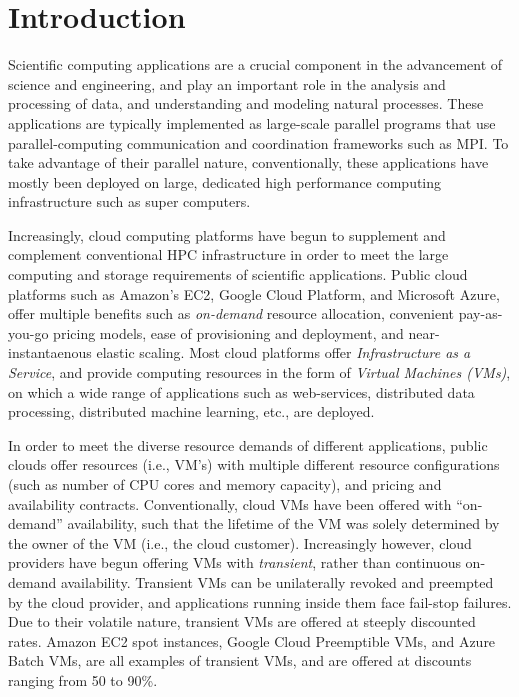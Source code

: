 \section{Introduction}


Scientific computing applications are a crucial component in the advancement of science and engineering, and play an important role in the analysis and processing of data, and understanding and modeling natural processes. 
These applications are typically implemented as large-scale parallel programs that use parallel-computing communication and coordination frameworks such as MPI.
To take advantage of their parallel nature, conventionally, these applications have mostly been deployed on large, dedicated high performance computing infrastructure such as super computers. 



Increasingly, cloud computing platforms have begun to supplement and complement conventional HPC infrastructure in order to meet the large computing and storage requirements of scientific applications. 
Public cloud platforms such as Amazon's EC2, Google Cloud Platform, and Microsoft Azure, offer multiple benefits such as \emph{on-demand} resource allocation, convenient pay-as-you-go pricing models, ease of provisioning and deployment, and near-instantaenous elastic scaling.
Most cloud platforms offer \emph{Infrastructure as a Service}, and provide computing resources in the form of \emph{Virtual Machines (VMs)}, on which a wide range of  applications such as web-services, distributed data processing, distributed machine learning, etc., are deployed. 


In order to meet the diverse resource demands of different applications, public clouds offer resources (i.e., VM's) with multiple different resource configurations (such as number of CPU cores and memory capacity), and pricing and availability contracts. 
Conventionally, cloud VMs have been offered with ``on-demand'' availability, such that the lifetime of the VM was solely determined by the owner of the VM (i.e., the cloud customer). 
Increasingly however, cloud providers have begun offering VMs with \emph{transient}, rather than continuous on-demand availability. 
Transient VMs can be unilaterally revoked and preempted by the cloud provider, and applications running inside them face fail-stop failures. 
Due to their volatile nature, transient VMs are offered at steeply discounted rates. Amazon EC2 spot instances, Google Cloud Preemptible VMs, and Azure Batch VMs, are all examples of transient VMs, and are offered at discounts ranging from 50 to 90\%.  

